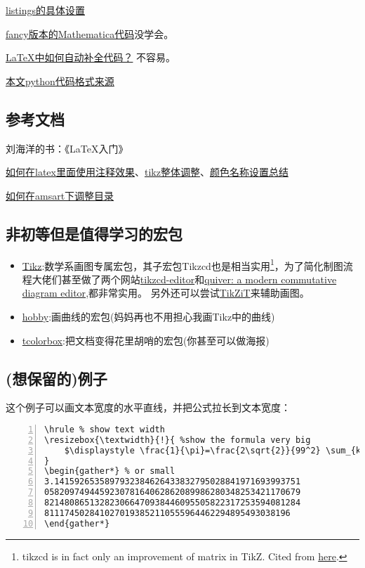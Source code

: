 \documentclass[11pt]{amsart}
\begin{document}
 \href{http://blog.sina.com.cn/s/blog_a382a9080102z25i.html}{listings的具体设置}
  
   \href{https://tex.stackexchange.com/questions/84748/fanciest-way-to-include-mathematica-code-in-latex}{fancy版本的Mathematica代码}没学会。
           
\href{https://tex.stackexchange.com/questions/126241/autoindent-in-texmaker}{\LaTeX 中如何自动补全代码？} 不容易。

\href{https://tex.stackexchange.com/questions/235783/listings-recognize-numbers-and-1e-3}{本文python代码格式来源}

\subsection{参考文档}
刘海洋的书：《\LaTeX 入门》

\href{https://liam.page/2016/09/24/TikZ-comment-to-text/}{如何在latex里面使用注释效果}、\href{https://newbedev.com/how-of-to-change-font-size-for-every-nodes-in-tikzcd}{tikz整体调整}、\href{http://latexcolor.com/}{颜色名称设置总结}

\href{https://tex.stackexchange.com/questions/322268/table-of-contents-amsart}{如何在amsart下调整目录}
\subsection{非初等但是值得学习的宏包}
\begin{itemize}
\item \href{https://ctan.org/pkg/pgf}{Tikz}:数学系画图专属宏包，其子宏包Tikzcd也是相当实用\footnote{tikzcd is in fact only an improvement of matrix in TikZ. Cited from \href{https://tex.stackexchange.com/questions/484743/format-single-node-in-tikzcd}{here}.}，为了简化制图流程大佬们甚至做了两个网站\href{https://tikzcd.yichuanshen.de/}{tikzcd-editor}和\href{https://q.uiver.app/}{quiver: a modern commutative diagram editor},都非常实用。 另外还可以尝试\href{https://tikzit.github.io/}{TikZiT}来辅助画图。
\item \href{https://ctan.org/pkg/hobby}{hobby}:画曲线的宏包(妈妈再也不用担心我画Tikz中的曲线)
\item \href{https://ctan.org/pkg/tcolorbox}{tcolorbox}:把文档变得花里胡哨的宏包(你甚至可以做海报)
\end{itemize}
\subsection{(想保留的)例子}
这个例子可以画文本宽度的水平直线，并把公式拉长到文本宽度：
\begin{lstlisting}[numbers=left,numberstyle=\tiny,numbersep=10pt]
\hrule % show text width
\resizebox{\textwidth}{!}{ %show the formula very big
	$\displaystyle \frac{1}{\pi}=\frac{2\sqrt{2}}{99^2} \sum_{k=0}^{\infty} \frac{(4k)!}{k!^4}\frac{26390k+1103}{396^{4k}} $
}
\begin{gather*} % or small
3.1415926535897932384626433832795028841971693993751
058209749445923078164062862089986280348253421170679
821480865132823066470938446095505822317253594081284
8111745028410270193852110555964462294895493038196
\end{gather*}
\end{lstlisting}
\end{document}
